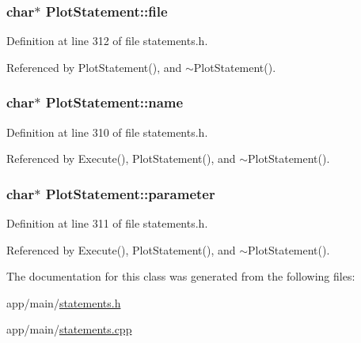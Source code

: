 \subsubsection[{\texorpdfstring{file}{file}}]{\setlength{\rightskip}{0pt plus 5cm}char$\ast$ Plot\+Statement\+::file\hspace{0.3cm}{\ttfamily [private]}}\hypertarget{classPlotStatement_af5c41edc8fcd55bbf986e02fbf176885}{}\label{classPlotStatement_af5c41edc8fcd55bbf986e02fbf176885}


Definition at line 312 of file statements.\+h.



Referenced by Plot\+Statement(), and $\sim$\+Plot\+Statement().

\subsubsection[{\texorpdfstring{name}{name}}]{\setlength{\rightskip}{0pt plus 5cm}char$\ast$ Plot\+Statement\+::name\hspace{0.3cm}{\ttfamily [private]}}\hypertarget{classPlotStatement_ab057af7c22b9fd7ec06e530174dda200}{}\label{classPlotStatement_ab057af7c22b9fd7ec06e530174dda200}


Definition at line 310 of file statements.\+h.



Referenced by Execute(), Plot\+Statement(), and $\sim$\+Plot\+Statement().

\subsubsection[{\texorpdfstring{parameter}{parameter}}]{\setlength{\rightskip}{0pt plus 5cm}char$\ast$ Plot\+Statement\+::parameter\hspace{0.3cm}{\ttfamily [private]}}\hypertarget{classPlotStatement_aa0356a6cdd1362b3efb6eb732249dcf2}{}\label{classPlotStatement_aa0356a6cdd1362b3efb6eb732249dcf2}


Definition at line 311 of file statements.\+h.



Referenced by Execute(), Plot\+Statement(), and $\sim$\+Plot\+Statement().



The documentation for this class was generated from the following files\+:\begin{DoxyCompactItemize}
\item 
app/main/\hyperlink{statements_8h}{statements.\+h}\item 
app/main/\hyperlink{statements_8cpp}{statements.\+cpp}\end{DoxyCompactItemize}
